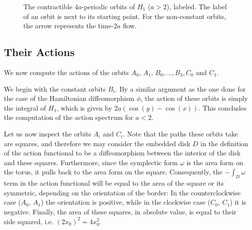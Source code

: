 \begin{figure}
\centering
{}
\caption{The contractible $4a$-periodic orbits of $H_1$ ($a > 2$), labeled. The label of an orbit is next to its starting point. For the non-constant orbits, the arrow represents the time-$2a$ flow.}
\label{orbitsh12}
\end{figure}

\subsection{Their Actions}

We now compute the actions of the orbits $A_0$, $A_1$, $B_0, \dots, B_3, C_0$ and $C_1$.

We begin with the constant orbits $B_i$. By a similar argument as the one done for the case of the Hamiltonian diffeomorphism $\phi$, the action of these orbits is simply the integral of $H_1$, which is given by $2a(\cos(y) - \cos(x))$. This concludes the computation of the action spectrum for $a < 2$.

Let us now inspect the orbits $A_i$ and $C_i$. Note that the paths these orbits take are squares, and therefore we may consider the embedded disk $D$ in the definition of the action functional to be a diffeomorphism between the interior of the disk and these squares. Furthermore, since the symplectic form $\omega$ is the area form on the torus, it pulls back to the area form on the square. Consequently, the $- \int_D \omega$ term in the action functional will be equal to the area of the square or its symmetric, depending on the orientation of the border: In the counterclockwise case ($A_0$, $A_1$) the orientation is positive, while in the clockwise case ($C_0$, $C_1$) it is negative. Finally, the area of these squares, in absolute value, is equal to their side squared, i.e. $(2x_0)^2 = 4x_0^2$.

